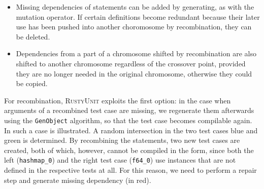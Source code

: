 \documentclass[paper=a4,%
  twoside,%
  BCOR4mm,%
  abstract=true,%
  toc=bibliography,%
  chapterprefix=true,%
  toc=bibliographynumbered,%
  open=right,%
  english,%
  pagesize=pdftex]{scrreprt}
\newcommand{\tech}{\textsc{RustyUnit}\xspace}
\begin{document}
\begin{itemize}
    \item Missing dependencies of statements can be added by generating, as with the mutation operator. If certain definitions become redundant because their later use has been pushed into another choromosome by recombination, they can be deleted.
    \item Dependencies from a part of a chromosome shifted by recombination are also shifted to another chromosome regardless of the crossover point, provided they are no longer needed in the original chromosome, otherwise they could be copied.
\end{itemize}


For recombination, \tech exploits the first option: in the case when arguments of a recombined test case are missing, we regenerate them afterwards using the \texttt{GenObject} algorithm, so that the test case becomes compilable again. In  such a case is illustrated. A random intersection in the two test cases blue and green is determined. By recombining the statements, two new test cases are created, both of which, however, cannot be compiled in the form, since both the left (\texttt{hashmap\string_0}) and the right test case (\texttt{f64\string_0}) use instances that are not defined in the respective tests at all. For this reason, we need to perform a repair step and generate missing dependency (in red).
\end{document}

